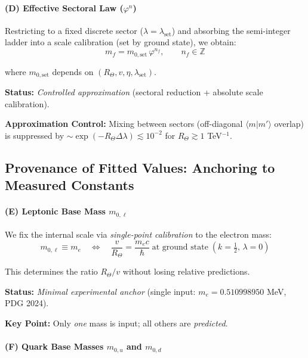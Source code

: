 \documentclass[12pt]{article}
\begin{document}
\paragraph{(D) Effective Sectoral Law ($\varphi^n$)}

Restricting to a fixed discrete sector ($\lambda = \lambda_{\text{set}}$) and absorbing the semi-integer ladder into a scale calibration (set by ground state), we obtain:
\begin{equation}
\boxed{m_f = m_{0,\text{set}} \, \varphi^{n_f}, \qquad n_f \in \mathbb{Z}}
\end{equation}

where $m_{0,\text{set}}$ depends on $(R_\Theta, v, \eta, \lambda_{\text{set}})$.

\textbf{Status:} \textit{Controlled approximation} (sectoral reduction + absolute scale calibration).

\textbf{Approximation Control:} Mixing between sectors (off-diagonal $\langle m | m' \rangle$ overlap) is suppressed by $\sim \exp(-R_\Theta \Delta\lambda) \lesssim 10^{-2}$ for $R_\Theta \gtrsim 1$ TeV$^{-1}$.

\subsection{Provenance of Fitted Values: Anchoring to Measured Constants}

\paragraph{(E) Leptonic Base Mass $m_{0,\ell}$}

We fix the internal scale via \textit{single-point calibration} to the electron mass:
\begin{equation}
m_{0,\ell} \equiv m_e \quad \Longleftrightarrow \quad \frac{v}{R_\Theta} = \frac{m_e c}{\hbar} \;\text{at ground state}\; (k = \tfrac{1}{2},\, \lambda = 0)
\end{equation}

This determines the ratio $R_\Theta / v$ without losing relative predictions.

\textbf{Status:} \textit{Minimal experimental anchor} (single input: $m_e = 0.510998950$ MeV, PDG 2024).

\textbf{Key Point:} Only \textit{one} mass is input; all others are \textit{predicted}.

\paragraph{(F) Quark Base Masses $m_{0,u}$ and $m_{0,d}$}
\end{document}
